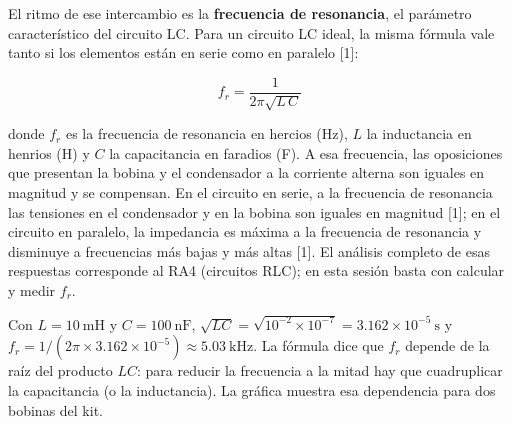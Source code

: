 \documentclass[11pt,letterpaper]{article}
\begin{document}
El ritmo de ese intercambio es la \textbf{frecuencia de resonancia}, el parámetro característico del circuito LC. Para un circuito LC ideal, la misma fórmula vale tanto si los elementos están en serie como en paralelo [1]:

\begin{equation}
  f_r = \frac{1}{2\pi\sqrt{L\,C}}
\end{equation}

donde $f_r$ es la frecuencia de resonancia en hercios (Hz), $L$ la inductancia en henrios (H) y $C$ la capacitancia en faradios (F). A esa frecuencia, las oposiciones que presentan la bobina y el condensador a la corriente alterna son iguales en magnitud y se compensan. En el circuito en serie, a la frecuencia de resonancia las tensiones en el condensador y en la bobina son iguales en magnitud [1]; en el circuito en paralelo, la impedancia es máxima a la frecuencia de resonancia y disminuye a frecuencias más bajas y más altas [1]. El análisis completo de esas respuestas corresponde al RA4 (circuitos RLC); en esta sesión basta con calcular y medir $f_r$.

Con $L = 10\ \text{mH}$ y $C = 100\ \text{nF}$, $\sqrt{LC} = \sqrt{10^{-2} \times 10^{-7}} = 3.162 \times 10^{-5}\ \text{s}$ y $f_r = 1/(2\pi \times 3.162 \times 10^{-5}) \approx 5.03\ \text{kHz}$. La fórmula dice que $f_r$ depende de la raíz del producto $LC$: para reducir la frecuencia a la mitad hay que cuadruplicar la capacitancia (o la inductancia). La gráfica muestra esa dependencia para dos bobinas del kit.
\end{document}
